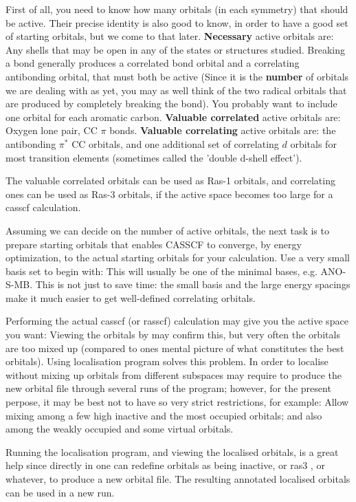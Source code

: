 First of all, you need to know how many orbitals (in each symmetry) that
should be active. Their precise identity is also good to know, in order
to have a good set of starting orbitals, but we come to that later.
{\bf Necessary} active orbitals are: Any shells that may be open in any of the 
states or structures studied. Breaking a bond generally produces a
correlated bond orbital and a correlating antibonding orbital, that must
both be active (Since it is the {\bf number} of orbitals we are dealing
with as yet, you may as well think of the two radical orbitals that are 
produced by completely breaking the bond). 
You probably want to include one orbital for each aromatic carbon.
{\bf Valuable correlated} active orbitals are: Oxygen lone pair, CC
$\pi$ bonds.  {\bf Valuable correlating} active orbitals are: the 
antibonding $\pi^{\ast}$ CC orbitals, and one additional set of 
correlating $d$ orbitals for most transition elements (sometimes 
called the 'double d-shell effect').

The valuable correlated orbitals can be used as Ras-1 orbitals, and
correlating ones can be used as Ras-3 orbitals, if the active space
becomes too large for a casscf calculation.

Assuming we can decide on the number of active orbitals, the next task
is to prepare starting orbitals that enables CASSCF to converge, by
energy optimization, to the actual starting orbitals for your calculation.
Use a very small basis set to begin with: This will usually be one of the
minimal bases, e.g. ANO-S-MB. This is not just to save time: the small 
basis and the large energy spacings make it much easier to get well-defined 
correlating orbitals.

Performing the actual casscf (or rasscf) calculation may give you the
active space you want: Viewing the orbitals by  may confirm this, but
very often the orbitals are too mixed up (compared to ones mental
picture of what constitutes the best orbitals).
Using  localisation program solves this problem. In order to localise 
without mixing up orbitals from different subspaces may require to
produce the new orbital file through several runs of the program;
however, for the present perpose, it may be best not to have so
very strict restrictions, for example: Allow mixing among a few
high inactive and the most occupied orbitals;  and also among the
weakly occupied and some virtual orbitals.

Running the localisation program, and viewing the localised orbitals,
is a great help since directly in  one can redefine orbitals as
being inactive, or ras3 , or whatever, to produce a new orbital file.
The resulting annotated localised orbitals can be used in a new run.

